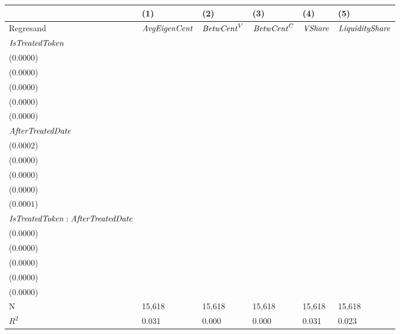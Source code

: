 \begin{tabular}{llllll}
\toprule
{} &                                      (1) &                                   (2) &                                   (3) &                                      (4) &                                      (5) \\
\midrule
Regresand                                     &                     ${\it AvgEigenCent}$ &                    ${\it BetwCent}^V$ &                    ${\it BetwCent}^C$ &                           ${\it VShare}$ &                   ${\it LiquidityShare}$ \\
${\it IsTreatedToken}$                        &     \makecell{$0.0000^{}$ \\ ($0.0000$)} &  \makecell{$0.0000^{}$ \\ ($0.0000$)} &  \makecell{$0.0000^{}$ \\ ($0.0000$)} &     \makecell{$0.0000^{}$ \\ ($0.0000$)} &     \makecell{$0.0000^{}$ \\ ($0.0000$)} \\
${\it AfterTreatedDate}$                      &  \makecell{$0.0043^{***}$ \\ ($0.0002$)} &  \makecell{$0.0000^{}$ \\ ($0.0000$)} &  \makecell{$0.0000^{}$ \\ ($0.0000$)} &  \makecell{$0.0009^{***}$ \\ ($0.0000$)} &  \makecell{$0.0011^{***}$ \\ ($0.0001$)} \\
${\it IsTreatedToken}:{\it AfterTreatedDate}$ &     \makecell{$0.0000^{}$ \\ ($0.0000$)} &  \makecell{$0.0000^{}$ \\ ($0.0000$)} &  \makecell{$0.0000^{}$ \\ ($0.0000$)} &     \makecell{$0.0000^{}$ \\ ($0.0000$)} &     \makecell{$0.0000^{}$ \\ ($0.0000$)} \\
\midrule N                                    &                                   15,618 &                                15,618 &                                15,618 &                                   15,618 &                                   15,618 \\
$R^2$                                         &                                    0.031 &                                 0.000 &                                 0.000 &                                    0.031 &                                    0.023 \\
\bottomrule
\end{tabular}
